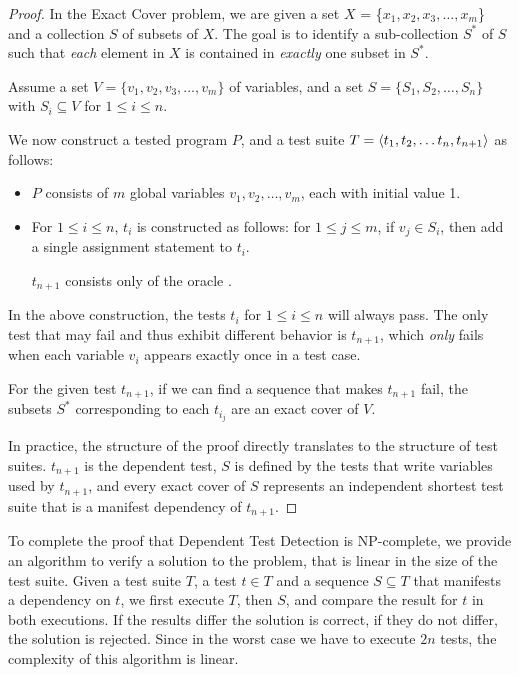 \begin{proof}
In the Exact Cover problem,
we are given a set $X$ = \{$x_1, x_2, x_3, \dots, x_m$\} and a collection $S$ of subsets of $X$.
The goal is to identify a sub-collection $S^*$ of $S$ such that \textit{each}
element in $X$ is contained in \textit{exactly} one subset in $S^*$.  

Assume a set $V = \{v_1, v_2, v_3, \dots, v_m\}$ of variables,
and a set $S = \{S_1, S_2, \dots, S_n\}$ with $S_i \subseteq V$ for $ 1\leq i
\leq n$. 

We now construct a tested program $P$, and a test suite
$T =  \langle t_1, t_2, \dots t_n , t_{n+1} \rangle $ as follows:

\begin{itemize}

\item $P$ consists of $m$ global variables 
$v_1, v_2,\dots, v_m$, each with initial value 1.

\item 
For $1 \le i \le n$, $t_i$ is constructed as follows:
for $1 \le j \le m$, if $v_j \in S_i$, then add a
single assignment statement  to $t_i$.

$t_{n+1}$ consists only of the oracle
.

\end{itemize}

In the above construction, the tests $t_i$ for $1 \le i \le n$ 
will always pass. The only
test that may fail and thus exhibit different behavior is $t_{n+1}$, which 
\emph{only} fails when each variable $v_i$ appears exactly
once in a test case.

For the given test $t_{n+1}$, if we can
find a sequence 
that makes $t_{n+1}$ fail, the subsets $S^*$ corresponding
to each $t_{i_j}$ are an exact cover of $V$.

In practice, the structure of the proof directly translates to the
structure of test suites. $t_{n+1}$ is the dependent test, $S$ is
defined by the tests that write variables used by $t_{n+1}$, and every
exact cover of $S$ represents an independent shortest test suite that
is a manifest dependency of $t_{n+1}$.
\end{proof}

To complete the proof that Dependent Test Detection is NP-complete, we
provide an algorithm to verify a solution to the problem, that is
linear in the size of the test suite.
Given a test suite $T$, a test $t \in T$ and a sequence
$S \subseteq T$ that manifests a dependency on $t$, we first execute $T$, then $S$, and
compare the result for $t$ in both executions. 
If the results differ the solution is correct, if they do not differ,
the solution is rejected.
Since in the worst case we have to execute $2n$ tests, the complexity
of this algorithm is linear. 



